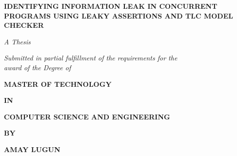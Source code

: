 \documentclass[a4paper,12pt]{report}
\newcommand{\thesistitle}{Identifying Information Leak in Concurrent Programs using Leaky Assertions and TLC Model Checker}
\newcommand{\authorname}{Amay Lugun}
\newcommand{\degreename}{Master of Technology}
\newcommand{\departmentname}{Computer Science and Engineering}
\begin{document}

\begin{titlepage}
    \centering
    
    \vspace*{-0.2cm}
    {\fontsize{18}{25}\selectfont \textbf{\MakeUppercase{\thesistitle}}\par}
    
    \vspace{1.5cm}
    
    {\fontsize{14}{20}\selectfont \textit{A Thesis}\par}
    \vspace{0.45cm}
    {\fontsize{12.5}{18}\selectfont \textit{Submitted in partial fulfillment of the requirements for the}\\
    \textit{award of the Degree of}\par}
    
    \vspace{1.3cm}
    
    {\fontsize{14}{20}\selectfont \textbf{\MakeUppercase{\degreename}}\par}
    \vspace{0.5cm}
    {\fontsize{14}{18}\selectfont \textbf{IN}\par}
    \vspace{0.5cm}
    {\fontsize{14}{20}\selectfont \textbf{\MakeUppercase{\departmentname}}\par}
    
    \vspace{1.3cm}
    
    {\fontsize{13}{18}\selectfont \textbf{BY}\par}
    
    \vspace{0.7cm}
    
    {\fontsize{13}{18}\selectfont \textbf{\MakeUppercase{\authorname}}\par}
    
    \vspace{0.5cm}
    

\end{titlepage}
\end{document}
